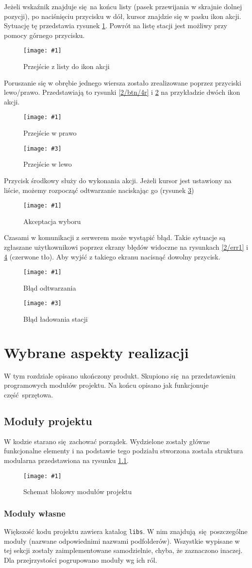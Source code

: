 \documentclass[polish]{aghengthesis}
\newcommand{\imgint}[4]{
	\begin{figure}[{#4}]
		\centering
		\texttt{[image: \#1]}
		\caption{#2}
		\label{#1}
	\end{figure}
}
\newcommand{\imgh}[3]{\imgint{#1}{#2}{#3}{H}}
\newcommand{\imgintss}[5]{
	\begin{figure}[{#5}]
		\centering
		\begin{minipage}{.45\textwidth}
			\centering
			\texttt{[image: \#1]}
			\caption{#2}
			\label{#1}
		\end{minipage}%
		\hfill
		\begin{minipage}{.45\textwidth}
			\centering
			\texttt{[image: \#3]}
			\caption{#4}
			\label{#3}
		\end{minipage}
	\end{figure}
}
\newcommand{\imghss}[4]{\imgintss{#1}{#2}{#3}{#4}{H}}
\begin{document}
		Jeżeli wskaźnik znajduje się na końcu listy (pasek przewijania w skrajnie dolnej pozycji), po naciśnięciu przycisku w dół, kursor znajdzie się w pasku ikon akcji. Sytuację tę przedstawia rysunek \ref{2/btn/3}. Powrót na listę stacji jest możliwy przy pomocy górnego przycisku.
		\imgh{2/btn/3}{Przejście z listy do ikon akcji}{0.7}
		
		Poruszanie się w obrębie jednego wiersza zostało zrealizowane poprzez przyciski \mbox{lewo/prawo}. Przedstawiają to rysunki \ref{2/btn/4r} i \ref{2/btn/4l} na przykładzie dwóch ikon akcji.
		\imghss{2/btn/4r}{Przejście w prawo}{2/btn/4l}{Przejście w lewo}
		
		Przycisk środkowy służy do wykonania akcji. Jeżeli kursor jest ustawiony na liście, możemy rozpocząć odtwarzanie naciskając go (rysunek \ref{2/btn/5})
		\imgh{2/btn/5}{Akceptacja wyboru}{0.7}
				
		Czasami w komunikacji z serwerem może wystąpić błąd. Takie sytuacje są zgłaszane użytkownikowi poprzez ekrany błędów widoczne na rysunkach \ref{2/err1} i \ref{2/err2} (czerwone tło). Aby wyjść z takiego ekranu nacisnąć dowolny przycisk.
		\imghss{2/err1}{Błąd odtwarzania}{2/err2}{Błąd ładowania stacji}

\chapter{Wybrane aspekty realizacji}
	W tym rozdziale opisano ukończony produkt.
	Skupiono się na przedstawieniu programowych modułów projektu. Na końcu opisano jak funkcjonuje część sprzętowa.
	
	\section{Moduły projektu}
		W kodzie starano się zachować porządek. Wydzielone zostały główne funkcjonalne elementy i na podstawie tego podziału stworzona została struktura modularna przedstawiona na rysunku \ref{3/PicoRadio-code-block-diagram}.
		\imgh{3/PicoRadio-code-block-diagram}{Schemat blokowy modułów projektu}{0.75}
		
		\subsection{Moduły własne}
			Większość kodu projektu zawiera katalog \lstinline|libs|. W nim znajdują się poszczególne moduły (nazwane odpowiednimi nazwami podfolderów). Wszystkie wypisane w tej sekcji zostały zaimplementowane samodzielnie, chyba, że zaznaczono inaczej. Dla przejrzystości pogrupowano moduły wg ich ról.
		
\end{document}

